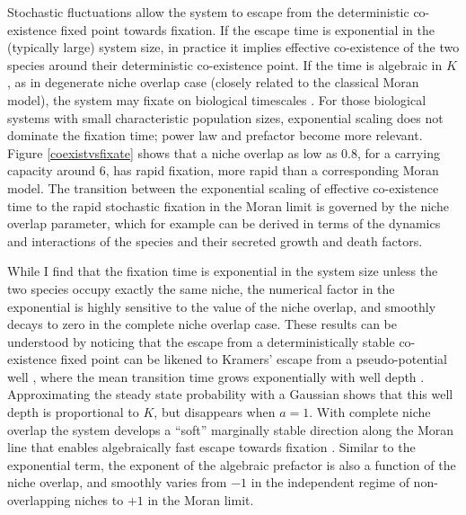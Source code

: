 Stochastic fluctuations allow the system to escape from the deterministic co-existence fixed point towards fixation. 
If the escape time is exponential in the (typically large) system size, in practice it implies effective co-existence of the two species around their deterministic co-existence point. 
If the time is algebraic in $K$, as in degenerate niche overlap case (closely related to the classical Moran model), the system may fixate on biological timescales \cite{Kimura1964,Moran1962}. 
For those biological systems with small characteristic population sizes, exponential scaling does not dominate the fixation time; power law and prefactor become more relevant. 
Figure \ref{coexistvsfixate} shows that a niche overlap as low as $0.8$, for a carrying capacity around $6$, has rapid fixation, more rapid than a corresponding Moran model. 
The transition between the exponential scaling of effective co-existence time to the rapid stochastic fixation in the Moran limit is governed by the niche overlap parameter, which for example can be derived in terms of the dynamics and interactions of the species and their secreted growth and death factors. %

While I find that the fixation time is exponential in the system size unless the two species occupy exactly the same niche, the numerical factor in the exponential is highly sensitive to the value of the niche overlap, and smoothly decays to zero in the complete niche overlap case. 
These results can be understood by noticing that the escape from a deterministically stable co-existence fixed point can be likened to Kramers' escape from a pseudo-potential well \cite{Bez1981,Hanggi1990,Ovaskainen2010,Dobrinevski2012}, where the mean transition time grows exponentially with well depth \cite{Ovaskainen2010}. %
Approximating the steady state probability with a Gaussian shows that this well depth is proportional to $K$, but disappears when $a=1$. 
With complete niche overlap the system develops a ``soft'' marginally stable direction along the Moran line that enables algebraically fast escape towards fixation \cite{Dobrinevski2012,Chotibut2015}. 
Similar to the exponential term, the exponent of the algebraic prefactor is also a function of the niche overlap, and smoothly varies from $-1$ in the independent regime of non-overlapping niches to $+1$ in the Moran limit. 

